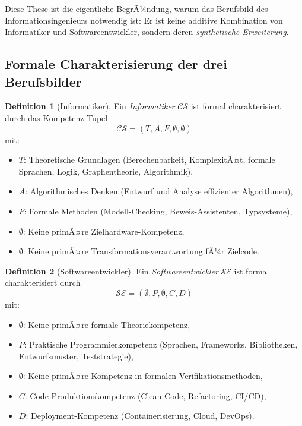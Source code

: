 ﻿\documentclass[a4paper,12pt]{report}
\theoremstyle{definition}
\newtheorem{definition}{Definition}[section]
\begin{document}
Diese These ist die eigentliche BegrÃ¼ndung, warum das Berufsbild des
Informationsingenieurs notwendig ist: Er ist keine additive Kombination von
Informatiker und Softwareentwickler, sondern deren \emph{synthetische Erweiterung}.

\subsection{Formale Charakterisierung der drei Berufsbilder}

\begin{definition}[Informatiker]
\label{def:informatiker}
Ein \emph{Informatiker} $\mathcal{CS}$ ist formal charakterisiert durch das Kompetenz-Tupel
\[
  \mathcal{CS} = (T, A, F, \emptyset, \emptyset)
\]
mit:
\begin{itemize}
  \item $T$: Theoretische Grundlagen (Berechenbarkeit, KomplexitÃ¤t, formale Sprachen,
        Logik, Graphentheorie, Algorithmik),
  \item $A$: Algorithmisches Denken (Entwurf und Analyse effizienter Algorithmen),
  \item $F$: Formale Methoden (Modell-Checking, Beweis-Assistenten, Typsysteme),
  \item $\emptyset$: Keine primÃ¤re Zielhardware-Kompetenz,
  \item $\emptyset$: Keine primÃ¤re Transformationsverantwortung fÃ¼r Zielcode.
\end{itemize}
\end{definition}

\begin{definition}[Softwareentwickler]
\label{def:swentw}
Ein \emph{Softwareentwickler} $\mathcal{SE}$ ist formal charakterisiert durch
\[
  \mathcal{SE} = (\emptyset, P, \emptyset, C, D)
\]
mit:
\begin{itemize}
  \item $\emptyset$: Keine primÃ¤re formale Theoriekompetenz,
  \item $P$: Praktische Programmierkompetenz (Sprachen, Frameworks, Bibliotheken,
        Entwurfsmuster, Teststrategie),
  \item $\emptyset$: Keine primÃ¤re Kompetenz in formalen Verifikationsmethoden,
  \item $C$: Code-Produktionskompetenz (Clean Code, Refactoring, CI/CD),
  \item $D$: Deployment-Kompetenz (Containerisierung, Cloud, DevOps).
\end{itemize}
\end{definition}
\end{document}
